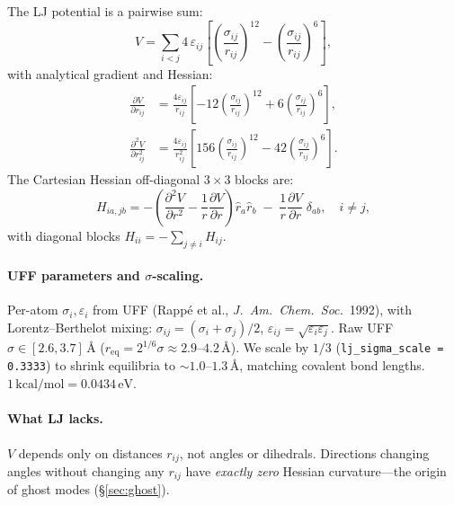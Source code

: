 \documentclass[11pt,a4paper]{article}
\theoremstyle{definition}
\begin{document}
The LJ potential is a pairwise sum:
\begin{equation}
  V = \sum_{i<j} 4\,\varepsilon_{ij}
      \left[\left(\frac{\sigma_{ij}}{r_{ij}}\right)^{12}
            - \left(\frac{\sigma_{ij}}{r_{ij}}\right)^{6}\right],
  \label{eq:lj}
\end{equation}
with analytical gradient and Hessian:
\begin{align}
  \frac{\partial V}{\partial r_{ij}}
    &= \frac{4\varepsilon_{ij}}{r_{ij}}
       \left[-12\left(\frac{\sigma_{ij}}{r_{ij}}\right)^{12}
             + 6\left(\frac{\sigma_{ij}}{r_{ij}}\right)^{6}\right],
  \label{eq:lj-deriv} \\[4pt]
  \frac{\partial^2 V}{\partial r_{ij}^2}
    &= \frac{4\varepsilon_{ij}}{r_{ij}^2}
       \left[156\left(\frac{\sigma_{ij}}{r_{ij}}\right)^{12}
             - 42\left(\frac{\sigma_{ij}}{r_{ij}}\right)^{6}\right].
  \label{eq:lj-hess-rr}
\end{align}
The Cartesian Hessian off-diagonal $3{\times}3$ blocks are:
\begin{equation}
  H_{ia,jb} = -\!\left(
    \frac{\partial^2 V}{\partial r^2} - \frac{1}{r}\frac{\partial V}{\partial r}
  \right) \hat{r}_a \hat{r}_b
  \;-\; \frac{1}{r}\frac{\partial V}{\partial r}\;\delta_{ab},
  \quad i \ne j,
  \label{eq:lj-hess-cart}
\end{equation}
with diagonal blocks $H_{ii} = -\sum_{j \ne i} H_{ij}$.

\paragraph{UFF parameters and $\sigma$-scaling.}
Per-atom $\sigma_i, \varepsilon_i$ from UFF
(Rapp\'{e} et al., \textit{J.\ Am.\ Chem.\ Soc.}\ 1992), with
Lorentz--Berthelot mixing:
$\sigma_{ij} = (\sigma_i + \sigma_j)/2$,
$\varepsilon_{ij} = \sqrt{\varepsilon_i \varepsilon_j}$.
Raw UFF $\sigma \in [2.6, 3.7]$\,\AA{} ($r_\text{eq} = 2^{1/6}\sigma
\approx 2.9$--$4.2$\,\AA).  We scale by $1/3$
(\texttt{lj\_sigma\_scale\,=\,0.3333}) to shrink equilibria to
${\sim}1.0$--$1.3$\,\AA, matching covalent bond lengths.
$1\,\text{kcal/mol} = 0.0434\,\text{eV}$.

\paragraph{What LJ lacks.}
$V$ depends only on distances $r_{ij}$, not angles or dihedrals.
Directions changing angles without changing any $r_{ij}$ have
\emph{exactly zero} Hessian curvature---the origin of ghost modes
(\S\ref{sec:ghost}).
\end{document}
